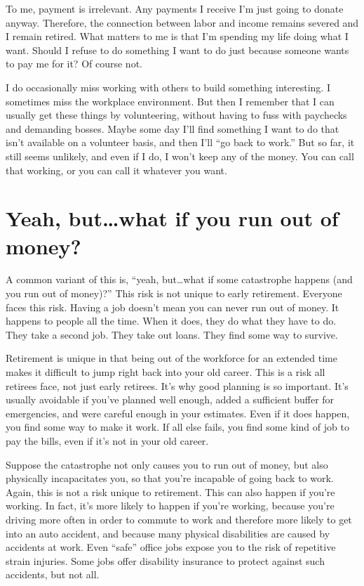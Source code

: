 To me, payment is irrelevant. Any payments I receive I'm just going to donate anyway. Therefore, the connection between labor and income remains severed and I remain retired. What matters to me is that I'm spending my life doing what I want. Should I refuse to do something I want to do just because someone wants to pay me for it? Of course not.

I do occasionally miss working with others to build something interesting. I sometimes miss the workplace environment. But then I remember that I can usually get these things by volunteering, without having to fuss with paychecks and demanding bosses. Maybe some day I'll find something I want to do that isn't available on a volunteer basis, and then I'll ``go back to work.'' But so far, it still seems unlikely, and even if I do, I won't keep any of the money. You can call that working, or you can call it whatever you want.

\section{Yeah, but\ldots what if you run out of money?}
A common variant of this is, ``yeah, but\ldots what if some catastrophe happens (and you run out of money)?'' This risk is not unique to early retirement. Everyone faces this risk. Having a job doesn't mean you can never run out of money. It happens to people all the time. When it does, they do what they have to do. They take a second job. They take out loans. They find some way to survive.

Retirement is unique in that being out of the workforce for an extended time makes it difficult to jump right back into your old career. This is a risk all retirees face, not just early retirees. It's why good planning is so important. It's usually avoidable if you've planned well enough, added a sufficient buffer for emergencies, and were careful enough in your estimates. Even if it does happen, you find some way to make it work. If all else fails, you find some kind of job to pay the bills, even if it's not in your old career.

Suppose the catastrophe not only causes you to run out of money, but also physically incapacitates you, so that you're incapable of going back to work. Again, this is not a risk unique to retirement. This can also happen if you're working. In fact, it's more likely to happen if you're working, because you're driving more often in order to commute to work and therefore more likely to get into an auto accident, and because many physical disabilities are caused by accidents at work. Even ``safe'' office jobs expose you to the risk of repetitive strain injuries. Some jobs offer disability insurance to protect against such accidents, but not all.

